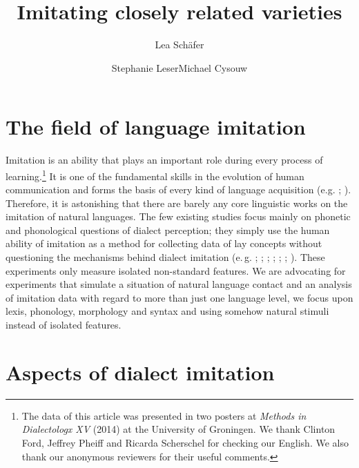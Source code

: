\documentclass[output=paper]{LSP/langsci}
\author{Lea Schäfer\affiliation{Philipps-Universität Marburg}\and Stephanie Leser\affiliation{Philipps-Universität Marburg}\lastand Michael Cysouw\affiliation{Philipps-Universität Marburg}}
\title{Imitating closely related varieties}
\begin{document}
   

\section{The field of language imitation}\label{abstract}

Imitation is an ability that plays an important role during every process of learning.\footnote{The data of this article was presented in two posters at \textit{Methods in Dialectologx XV} (2014) at the University of Groningen. We thank Clinton Ford, Jeffrey Pheiff and Ricarda Scherschel for checking our English. We also thank our anonymous reviewers for their useful comments.} It is one of the fundamental skills in the evolution of human communication and forms the basis of every kind of language acquisition  (e.g. \citealt{fitch_evolution_2010,hauser_language_2002,petkov_birds_2012,uzgiris_two_1981,markham_phonetic_1997,markham_listeners_1999,meltzoff_imitation_1977,meltzoff_imitative_2002}; \citealt[123]{tomasello_shared_2007}). Therefore, it is astonishing that there are barely any core linguistic works on the imitation of natural languages. The few existing studies focus mainly on phonetic and phonological questions of dialect perception; they simply use the human ability of imitation as a method for collecting data of lay concepts without questioning the mechanisms behind dialect imitation (e.\,g. \citealt{segerup_imitation_1999}; \cite{siegel_second_2010}; \cite{adank_imitation_2010}; \cite{purschke_imitation_2010}; \cite{babel_phonetic_2009}; \cite{neuhauser_phonetische_2012}; \cite{dossey_spontaneous_2012}). These experiments only measure isolated non-standard features. We are advocating for experiments that simulate a situation of natural language contact and an analysis of imitation data with regard to more than just one language level, we focus upon lexis, phonology, morphology and syntax and using somehow natural stimuli instead of isolated features.
    
\section{Aspects of dialect imitation}\label{aspects}
\end{document}
